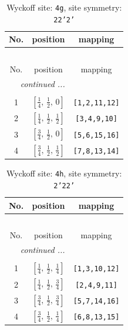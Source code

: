\documentclass[fleqn,8pt]{jsarticle}
\begin{document}
\renewcommand{\arraystretch}{1.2}
\begin{longtable}{ccc}
\caption{Wyckoff site: {\tt 4g}, site symmetry: {\tt 22'2'}}
 \\
 \hline \hline
No. & position & mapping \\ \hline \endfirsthead

\multicolumn{2}{l}{\tablename\ \thetable{}} \\
 \hline \hline
No. & position & mapping \\ \hline \endhead

 \hline \hline
\multicolumn{2}{r}{\footnotesize\it continued ...} \\ \endfoot

 \hline \hline
\multicolumn{2}{r}{} \\ \endlastfoot

1 & $\left[ \frac{1}{4},\, \frac{1}{2},\, 0 \right]$ & {\tt [1,2,11,12]} \\ \hline
2 & $\left[ \frac{1}{4},\, \frac{1}{2},\, \frac{1}{2} \right]$ & {\tt [3,4,9,10]} \\ \hline
3 & $\left[ \frac{3}{4},\, \frac{1}{2},\, 0 \right]$ & {\tt [5,6,15,16]} \\ \hline
4 & $\left[ \frac{3}{4},\, \frac{1}{2},\, \frac{1}{2} \right]$ & {\tt [7,8,13,14]} \\
\end{longtable}
\renewcommand{\arraystretch}{1.2}
\begin{longtable}{ccc}
\caption{Wyckoff site: {\tt 4h}, site symmetry: {\tt 2'22'}}
 \\
 \hline \hline
No. & position & mapping \\ \hline \endfirsthead

\multicolumn{2}{l}{\tablename\ \thetable{}} \\
 \hline \hline
No. & position & mapping \\ \hline \endhead

 \hline \hline
\multicolumn{2}{r}{\footnotesize\it continued ...} \\ \endfoot

 \hline \hline
\multicolumn{2}{r}{} \\ \endlastfoot

1 & $\left[ \frac{1}{4},\, \frac{1}{2},\, \frac{1}{4} \right]$ & {\tt [1,3,10,12]} \\ \hline
2 & $\left[ \frac{1}{4},\, \frac{1}{2},\, \frac{3}{4} \right]$ & {\tt [2,4,9,11]} \\ \hline
3 & $\left[ \frac{3}{4},\, \frac{1}{2},\, \frac{3}{4} \right]$ & {\tt [5,7,14,16]} \\ \hline
4 & $\left[ \frac{3}{4},\, \frac{1}{2},\, \frac{1}{4} \right]$ & {\tt [6,8,13,15]} \\
\end{longtable}
\end{document}
